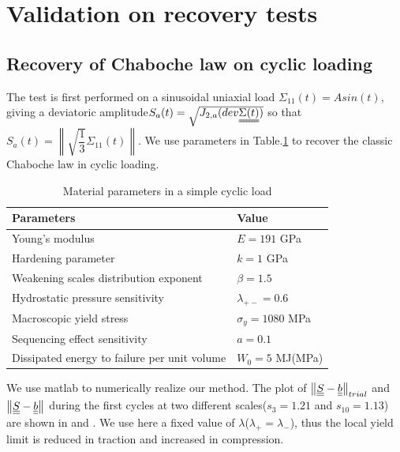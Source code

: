 \clearpage
\section{Validation on recovery tests}
\label{sec:5.8}
\subsection{Recovery of Chaboche law on cyclic loading}
The test is first performed on a sinusoidal uniaxial load $\Sigma_{11}(t)=Asin(t)$, giving a deviatoric amplitude$S_{a}(t)=\sqrt{J_{2,a}(dev\uuline{\Sigma(t)})}$  so that $S_{a}(t)=\left\| \sqrt{\dfrac{1}{3}}\Sigma_{11}(t)\right\| $. We use parameters in Table.\ref{tab:Sin} to recover the classic Chaboche law in cyclic loading.
\begin{table}[!h]
\centering
\begin{tabular}{ll}
\hline
\textbf{Parameters}                                         & \textbf{Value}                    \\ \hline
Young's modulus                                             & $E=191$ GPa                       \\
Hardening parameter                                         &  $k=1$ GPa \\
Weakening scales distribution exponent                      & $\beta=1.5$                             \\
Hydrostatic pressure sensitivity                            & $\lambda_{+-}=0.6$                     \\
Macroscopic yield stress                                    & $\sigma_y=1080$ MPa              \\
Sequencing effect sensitivity                               & $a=0.1$                        \\
Dissipated energy to failure per unit volume                & $W_0=5$ MJ(MPa)                       \\ \hline
\end{tabular}
\caption{Material parameters in a simple cyclic load }
\label{tab:Sin}
\end{table}

We use matlab to numerically realize our method. The plot of $\left\|  \uline{\uline{S}}-\uline{\uline{b}}\right\|_{trial}$ and $\left\|  \uline{\uline{S}}-\uline{\uline{b}}\right\|$ during the first cycles at two different scales($s_{3}=1.21$ and $s_{10}=1.13$) are shown in  and . We use here a fixed value of $\lambda$($\lambda_+=\lambda_-$), thus the local yield limit is reduced in traction and increased
in compression.

